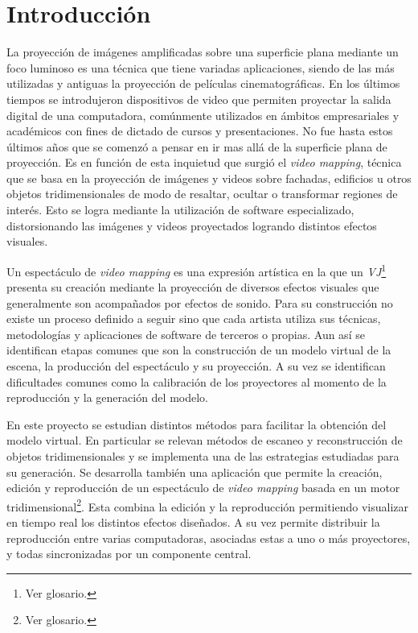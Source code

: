 ﻿\chapter{Introducción}

La proyección de imágenes amplificadas sobre una superficie plana mediante un foco luminoso es una técnica que tiene variadas aplicaciones, siendo de las más utilizadas y antiguas la proyección de películas cinematográficas. En los últimos tiempos se introdujeron dispositivos de video que permiten proyectar la salida digital de una computadora, comúnmente utilizados en ámbitos empresariales y académicos con fines de dictado de cursos y presentaciones. No fue hasta estos últimos años que se comenzó a pensar en ir mas allá de la superficie plana de proyección. Es en función de esta inquietud que surgió el \emph{video mapping}, técnica que se basa en la proyección de imágenes y videos sobre fachadas, edificios u otros objetos tridimensionales de modo de resaltar, ocultar o transformar regiones de interés. Esto se logra mediante la utilización de software especializado, distorsionando las imágenes y videos proyectados logrando distintos efectos visuales.

Un espectáculo de \emph{video mapping} es una expresión artística en la que un \emph{VJ}\footnote{Ver glosario.} presenta su creación mediante la proyección de diversos efectos visuales que generalmente son acompañados por efectos de sonido. Para su construcción no existe un proceso definido a seguir sino que cada artista utiliza sus técnicas, metodologías y aplicaciones de software de terceros o propias. Aun así se identifican etapas comunes que son la construcción de un modelo virtual de la escena, la producción del espectáculo y su proyección. A su vez se identifican dificultades comunes como la calibración de los proyectores al momento de la reproducción y la generación del modelo.

En este proyecto se estudian distintos métodos para facilitar la obtención del modelo virtual. En particular se relevan métodos de escaneo y reconstrucción de objetos tridimensionales y se implementa una de las estrategias estudiadas para su generación.
Se desarrolla también una aplicación que permite la creación, edición y reproducción de un espectáculo de \emph{video mapping} basada en un motor tridimensional\footnote{Ver glosario.}. Esta combina la edición y la reproducción permitiendo visualizar en tiempo real los distintos efectos diseñados. A su vez permite distribuir la reproducción entre varias computadoras, asociadas estas a uno o más proyectores, y todas sincronizadas por un componente central.

